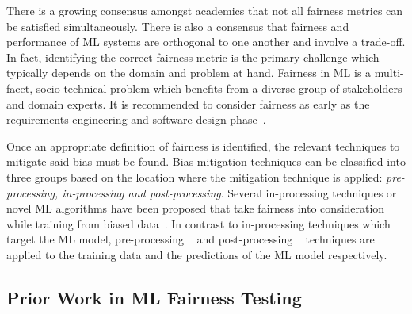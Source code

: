 \documentclass{article}
\begin{document}
There is a growing consensus amongst academics that not all fairness
metrics can be satisfied simultaneously. There is also a consensus
that fairness and performance of ML systems are orthogonal to one
another and involve a trade-off. In fact, identifying the correct
fairness metric is the primary challenge which typically depends on
the domain and problem at hand. Fairness in ML is a multi-facet,
socio-technical problem which benefits from a diverse group of
stakeholders and domain experts. It is recommended to consider
fairness as early as the requirements engineering and software design
phase \cite{zhang2020machine,chen2022fairness,mehrabi2021survey,zhang2021ignorance}.

Once an appropriate definition of fairness is identified, the relevant
techniques to mitigate said bias must be found. Bias mitigation
techniques can be classified into three groups based on the location
where the mitigation technique is applied: \emph{pre-processing,
in-processing and post-processing}. Several in-processing techniques
or novel ML algorithms have been proposed that take fairness into
consideration while training from biased
data \cite{zhang2018mitigating,agarwal2018reductions,kearns2018preventing,kearns2019empirical,kamishima2012fairness}. In
contrast to in-processing techniques which target the ML model,
pre-processing
 \cite{feldman2015certifying,zemel2013learning,calmon2017optimized,kamiran2012data}
and post-processing
 \cite{pleiss2017fairness,hardt2016equality,kamiran2012decision}
techniques are applied to the training data and the predictions of the
ML model respectively.

\subsection{Prior Work in ML Fairness Testing}\label{sec:prior-work}

\end{document}

